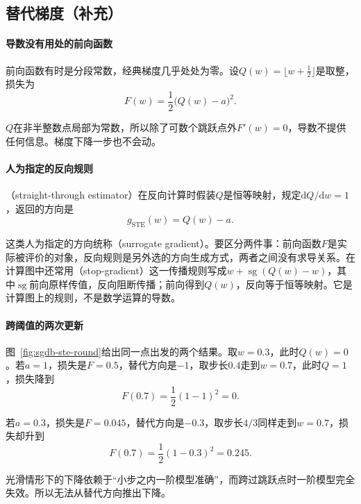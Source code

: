 \subsection{替代梯度（补充）}
\label{sec:sgdb-surrogate}

\paragraph{导数没有用处的前向函数}
前向函数有时是分段常数，经典梯度几乎处处为零。设$Q(w)=\lfloor w+\tfrac12\rfloor$是取整，损失为
\begin{equation}
 F(w)=\frac12\bigl(Q(w)-a\bigr)^2 .
 \label{eq:sgdb-rounding}
\end{equation}

$Q$在非半整数点局部为常数，所以除了可数个跳跃点外$F'(w)=0$，导数不提供任何信息。梯度下降一步也不会动。

\paragraph{人为指定的反向规则}
（straight-through estimator）在反向计算时假装$Q$是恒等映射，规定$\mathrm{d}Q/\mathrm{d}w=1$，返回的方向是
\begin{equation}
 g_{\mathrm{STE}}(w)=Q(w)-a .
 \label{eq:sgdb-ste}
\end{equation}

这类人为指定的方向统称（surrogate gradient）。要区分两件事：前向函数$F$是实际被评价的对象，反向规则是另外选的方向生成方式，两者之间没有求导关系。在计算图中还常用（stop-gradient）这一传播规则写成$w+\operatorname{sg}(Q(w)-w)$，其中$\operatorname{sg}$前向原样传值，反向阻断传播；前向得到$Q(w)$，反向等于恒等映射。它是计算图上的规则，不是数学运算的导数。

\paragraph{跨阈值的两次更新}
图~\ref{fig:sgdb-ste-round}给出同一点出发的两个结果。取$w=0.3$，此时$Q(w)=0$。若$a=1$，损失是$F=0.5$，替代方向是$-1$，取步长$0.4$走到$w=0.7$，此时$Q=1$，损失降到
\[
 F(0.7)=\frac12(1-1)^2=0.
\]

若$a=0.3$，损失是$F=0.045$，替代方向是$-0.3$，取步长$4/3$同样走到$w=0.7$，损失却升到
\[
 F(0.7)=\frac12(1-0.3)^2=0.245.
\]

光滑情形下的下降依赖于“小步之内一阶模型准确”，而跨过跳跃点时一阶模型完全失效。所以无法从替代方向推出下降。

